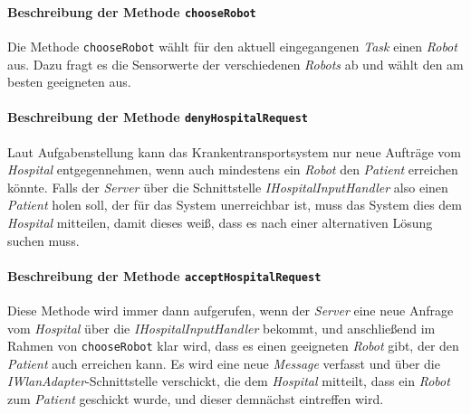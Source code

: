 			\paragraph{Beschreibung der Methode \texttt{chooseRobot}}
			Die Methode \texttt{chooseRobot} wählt für den aktuell eingegangenen \emph{Task} einen \emph{Robot} aus. 
			Dazu fragt es die Sensorwerte der verschiedenen \emph{Robots} ab und wählt den am besten geeigneten aus.
			
			\paragraph{Beschreibung der Methode \texttt{denyHospitalRequest}}
			Laut Aufgabenstellung kann das Krankentransportsystem nur neue Aufträge vom \textit{Hospital} entgegennehmen, wenn auch mindestens ein \textit{Robot} den \textit{Patient} erreichen könnte. 
			Falls der \textit{Server} über die Schnittstelle \textit{IHospitalInputHandler} also einen \textit{Patient} holen soll, der für das System unerreichbar ist, muss das System dies dem \textit{Hospital} mitteilen, damit dieses weiß, dass es nach einer alternativen Lösung suchen muss.
			
			
			\paragraph{Beschreibung der Methode \texttt{acceptHospitalRequest}}
			Diese Methode wird immer dann aufgerufen, wenn der \textit{Server} eine neue Anfrage vom \textit{Hospital} über die \textit{IHospitalInputHandler} bekommt, und anschließend im Rahmen von \texttt{chooseRobot} klar wird, dass es einen geeigneten \textit{Robot} gibt, der den \textit{Patient} auch erreichen kann. 
			Es wird eine neue \textit{Message} verfasst und über die \textit{IWlanAdapter}-Schnittstelle verschickt, die dem \textit{Hospital} mitteilt, dass ein \textit{Robot} zum \textit{Patient} geschickt wurde, und dieser demnächst eintreffen wird.
